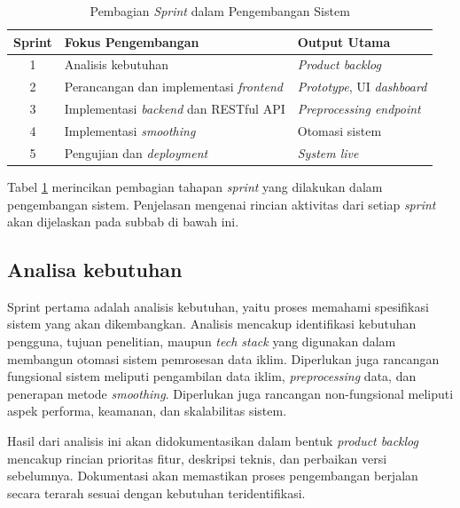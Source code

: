 \begin{table}[H]
    \centering
    \caption{Pembagian \textit{Sprint} dalam Pengembangan Sistem}
    \label{pembagian_sprint}
    \small 
    \setlength{\tabcolsep}{4pt} 
    \renewcommand{\arraystretch}{1.1} 
    
    \begin{tabular}{|c|l|l|}
        \hline
        \textbf{Sprint} & \textbf{Fokus Pengembangan} & \textbf{Output Utama} \\
        \hline
        1 & Analisis kebutuhan & \textit{Product backlog} \\
        \hline
        2 & Perancangan dan implementasi \textit{frontend} & \textit{Prototype}, UI \textit{dashboard} \\
        \hline
        3 & Implementasi \textit{backend} dan RESTful API & \textit{Preprocessing endpoint} \\
        \hline
        4 & Implementasi \textit{smoothing} & Otomasi sistem \\
        \hline
        5 & Pengujian dan \textit{deployment} & \textit{System live} \\
        \hline
    \end{tabular}
\end{table}

Tabel \ref{pembagian_sprint} merincikan pembagian tahapan \textit{sprint} yang dilakukan dalam pengembangan sistem. Penjelasan mengenai rincian aktivitas dari setiap \textit{sprint} akan dijelaskan pada subbab di bawah ini.
 
\subsection{Analisa kebutuhan}
Sprint pertama adalah analisis kebutuhan, yaitu proses memahami spesifikasi sistem yang akan dikembangkan. Analisis mencakup identifikasi kebutuhan pengguna, tujuan penelitian, maupun \textit{tech stack} yang digunakan dalam membangun otomasi sistem pemrosesan data iklim. Diperlukan juga rancangan fungsional sistem meliputi pengambilan data iklim, \textit{preprocessing} data, dan penerapan metode \textit{smoothing}. Diperlukan juga rancangan non-fungsional meliputi aspek performa, keamanan, dan skalabilitas sistem.

Hasil dari analisis ini akan didokumentasikan dalam bentuk \textit{product backlog} mencakup rincian prioritas fitur, deskripsi teknis, dan perbaikan versi sebelumnya. Dokumentasi akan memastikan proses pengembangan berjalan secara terarah sesuai dengan kebutuhan teridentifikasi.

